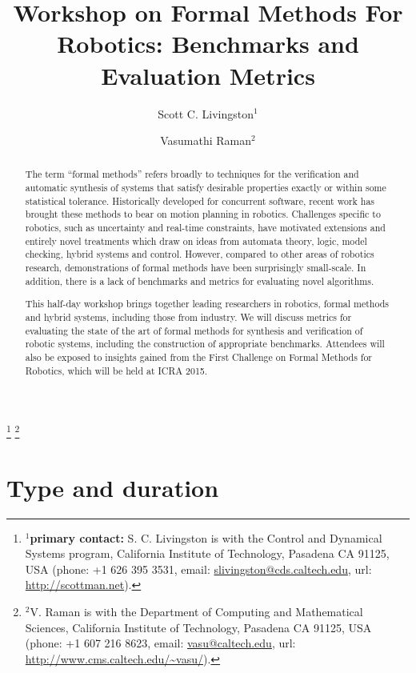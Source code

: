 \documentclass{amsart}
\begin{document}
\title{Workshop on Formal Methods For Robotics: Benchmarks and Evaluation Metrics}
\author[Scott C. Livingston]{Scott C. Livingston$^{1}$}
\author[Vasumathi Raman]{Vasumathi Raman$^{2}$}
\thanks{$^{1}$\textbf{primary contact:} S. C. Livingston is with the Control and Dynamical Systems program, California Institute of Technology, Pasadena CA 91125, USA (phone: +1 626 395 3531, email: \href{mailto:slivingston@cds.caltech.edu}{slivingston@cds.caltech.edu}, url: \url{http://scottman.net}).}%
\thanks{$^{2}$V. Raman is with the Department of Computing and Mathematical Sciences, California Institute of Technology, Pasadena CA 91125, USA (phone: +1 607 216 8623, email: \href{mailto:vasu@caltech.edu}{vasu@caltech.edu}, url: \url{http://www.cms.caltech.edu/~vasu/}).}%

\begin{abstract} %
The term ``formal methods'' refers broadly to techniques for the verification and automatic synthesis of systems that satisfy desirable properties exactly or within some statistical tolerance.  Historically developed for concurrent software, recent work has brought these methods to bear on motion planning in robotics. Challenges specific to robotics, such as uncertainty and
real-time constraints, have motivated extensions and entirely novel treatments which draw on ideas from automata theory, logic, model checking, hybrid systems and control.  However, compared to other areas of robotics research, demonstrations of formal methods have been surprisingly small-scale. In addition, there is a lack of benchmarks and metrics for evaluating novel algorithms.

This half-day workshop brings together leading researchers in robotics, formal methods and hybrid systems, including those from industry. We will discuss metrics for evaluating the state of the art of formal methods for synthesis and verification of robotic systems, including the construction of appropriate benchmarks. Attendees will also be exposed to insights gained from the First Challenge on Formal Methods for Robotics, which will be held at ICRA 2015. 

\end{abstract}
\maketitle


\section{Type and duration}
\end{document}
